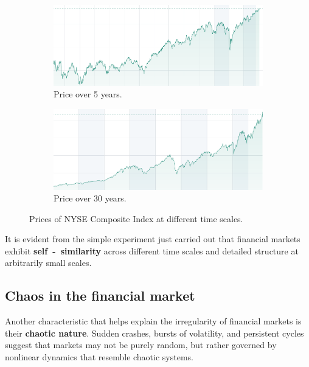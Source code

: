 \begin{itemize}
\begin{figure}[htbp]
    \begin{subfigure}{0.45\textwidth}
        \centering
        \includegraphics[width=\linewidth]{img/5y.png}
        \caption{Price over 5 years.}
    \end{subfigure}
    \hfill
    \begin{subfigure}{0.45\textwidth}
        \centering
        \includegraphics[width=\linewidth]{img/30y.png}
        \caption{Price over 30 years.}
    \end{subfigure}
        \caption{Prices of NYSE Composite Index at different time scales.}
    \label{fig:siximages}
\end{figure}
    It is evident from the simple experiment just carried out that financial markets exhibit \textbf{self~-~similarity} across different time scales and detailed structure at arbitrarily small scales.
\end{itemize}

\subsection{Chaos in the financial market}
Another characteristic that helps explain the irregularity of financial markets is their \textbf{chaotic nature}. Sudden crashes, bursts of volatility, and persistent cycles suggest that markets may not be purely random, but rather governed by nonlinear dynamics that resemble chaotic systems.\\

